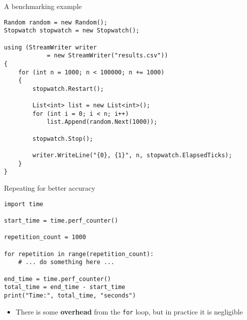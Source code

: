 \begin{frame}[fragile]{A benchmarking example}
    \begin{lstlisting}
Random random = new Random();
Stopwatch stopwatch = new Stopwatch();

using (StreamWriter writer 
            = new StreamWriter("results.csv"))
{
    for (int n = 1000; n < 100000; n += 1000)
    {
        stopwatch.Restart();

        List<int> list = new List<int>();
        for (int i = 0; i < n; i++)
            list.Append(random.Next(1000));

        stopwatch.Stop();

        writer.WriteLine("{0}, {1}", n, stopwatch.ElapsedTicks);
    }
}
    \end{lstlisting}
\end{frame}

\begin{frame}[fragile]{Repeating for better accuracy}
    \begin{lstlisting}
import time

start_time = time.perf_counter()

repetition_count = 1000

for repetition in range(repetition_count):
    # ... do something here ...

end_time = time.perf_counter()
total_time = end_time - start_time
print("Time:", total_time, "seconds")
    \end{lstlisting}
    
    \begin{itemize}
        \pause\item There is some \textbf{overhead} from the \lstinline{for} loop, but in practice it is negligible
    \end{itemize}
\end{frame}

\begin{frame}
    
\end{frame}

\begin{frame}
    
\end{frame}

